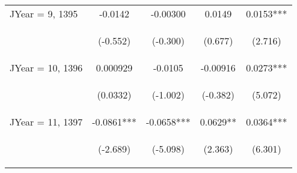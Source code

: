 \documentclass[]{article}
\begin{document}
\begin{center}
\begin{tabular}{lcccc}
        JYear = 9, 1395  & -0.0142                                         & -0.00300                                       & 0.0149                                         & 0.0153***                                      \\
        \vspace{4pt}     & \begin{footnotesize}(-0.552)\end{footnotesize}  & \begin{footnotesize}(-0.300)\end{footnotesize} & \begin{footnotesize}(0.677)\end{footnotesize}  & \begin{footnotesize}(2.716)\end{footnotesize}  \\
        JYear = 10, 1396 & 0.000929                                        & -0.0105                                        & -0.00916                                       & 0.0273***                                      \\
        \vspace{4pt}     & \begin{footnotesize}(0.0332)\end{footnotesize}  & \begin{footnotesize}(-1.002)\end{footnotesize} & \begin{footnotesize}(-0.382)\end{footnotesize} & \begin{footnotesize}(5.072)\end{footnotesize}  \\
        JYear = 11, 1397 & -0.0861***                                      & -0.0658***                                     & 0.0629**                                       & 0.0364***                                      \\
        \vspace{4pt}     & \begin{footnotesize}(-2.689)\end{footnotesize}  & \begin{footnotesize}(-5.098)\end{footnotesize} & \begin{footnotesize}(2.363)\end{footnotesize}  & \begin{footnotesize}(6.301)\end{footnotesize}  \\

\end{tabular}
\end{center}
\end{document}
